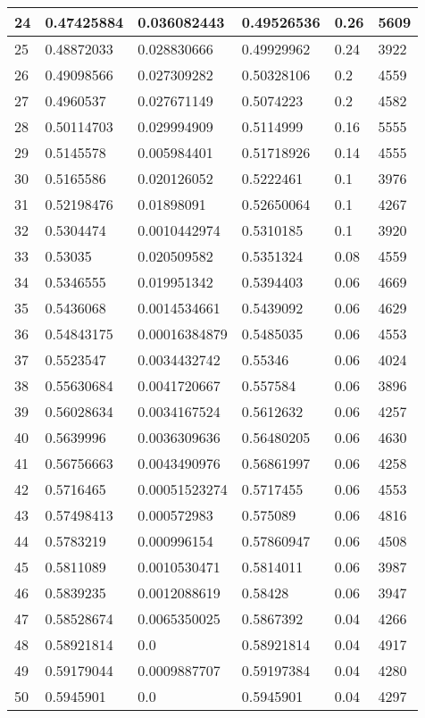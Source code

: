 \begin{longtable}{|l|l|l|l|l|l|}
24 & 0.47425884 & 0.036082443 & 0.49526536 & 0.26 & 5609 \\ \hline 
25 & 0.48872033 & 0.028830666 & 0.49929962 & 0.24 & 3922 \\ \hline 
26 & 0.49098566 & 0.027309282 & 0.50328106 & 0.2 & 4559 \\ \hline 
27 & 0.4960537 & 0.027671149 & 0.5074223 & 0.2 & 4582 \\ \hline 
28 & 0.50114703 & 0.029994909 & 0.5114999 & 0.16 & 5555 \\ \hline 
29 & 0.5145578 & 0.005984401 & 0.51718926 & 0.14 & 4555 \\ \hline 
30 & 0.5165586 & 0.020126052 & 0.5222461 & 0.1 & 3976 \\ \hline 
31 & 0.52198476 & 0.01898091 & 0.52650064 & 0.1 & 4267 \\ \hline 
32 & 0.5304474 & 0.0010442974 & 0.5310185 & 0.1 & 3920 \\ \hline 
33 & 0.53035 & 0.020509582 & 0.5351324 & 0.08 & 4559 \\ \hline 
34 & 0.5346555 & 0.019951342 & 0.5394403 & 0.06 & 4669 \\ \hline 
35 & 0.5436068 & 0.0014534661 & 0.5439092 & 0.06 & 4629 \\ \hline 
36 & 0.54843175 & 0.00016384879 & 0.5485035 & 0.06 & 4553 \\ \hline 
37 & 0.5523547 & 0.0034432742 & 0.55346 & 0.06 & 4024 \\ \hline 
38 & 0.55630684 & 0.0041720667 & 0.557584 & 0.06 & 3896 \\ \hline 
39 & 0.56028634 & 0.0034167524 & 0.5612632 & 0.06 & 4257 \\ \hline 
40 & 0.5639996 & 0.0036309636 & 0.56480205 & 0.06 & 4630 \\ \hline 
41 & 0.56756663 & 0.0043490976 & 0.56861997 & 0.06 & 4258 \\ \hline 
42 & 0.5716465 & 0.00051523274 & 0.5717455 & 0.06 & 4553 \\ \hline 
43 & 0.57498413 & 0.000572983 & 0.575089 & 0.06 & 4816 \\ \hline 
44 & 0.5783219 & 0.000996154 & 0.57860947 & 0.06 & 4508 \\ \hline 
45 & 0.5811089 & 0.0010530471 & 0.5814011 & 0.06 & 3987 \\ \hline 
46 & 0.5839235 & 0.0012088619 & 0.58428 & 0.06 & 3947 \\ \hline 
47 & 0.58528674 & 0.0065350025 & 0.5867392 & 0.04 & 4266 \\ \hline 
48 & 0.58921814 & 0.0 & 0.58921814 & 0.04 & 4917 \\ \hline 
49 & 0.59179044 & 0.0009887707 & 0.59197384 & 0.04 & 4280 \\ \hline 
50 & 0.5945901 & 0.0 & 0.5945901 & 0.04 & 4297 \\ \hline 
\end{longtable}